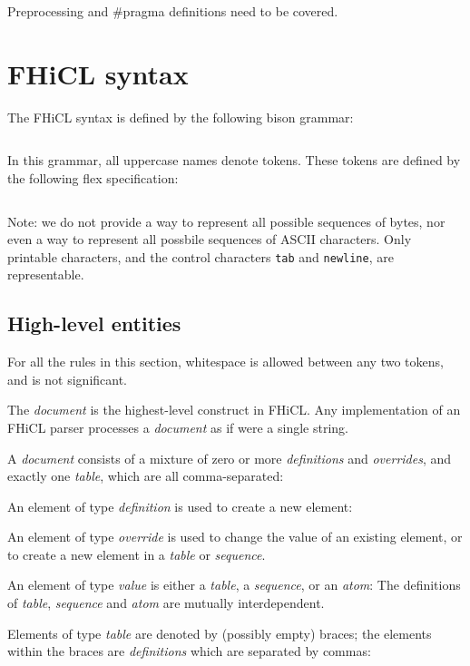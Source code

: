 \documentclass{memarticle}
\begin{document}
Preprocessing and \#pragma definitions need to be covered.

\chapter{FHiCL syntax}

The FHiCL syntax is defined by the following bison grammar:
\begin{verbatim}

\end{verbatim}

In this grammar,
all uppercase names denote tokens.
These tokens are defined by the following flex specification:
\begin{verbatim}

\end{verbatim}

\begin{fixme}
  Note: we do not provide a way to represent all possible sequences of
  bytes, nor even a way to represent all possbile sequences of ASCII
  characters. Only printable characters, and the control characters
  \texttt{tab} and \texttt{newline}, are representable.
\end{fixme}

\section{High-level entities}

For all the rules in this section,
whitespace is allowed between any two tokens,
and is not significant.

The \emph{document} is the highest-level construct
in FHiCL.
Any implementation of an FHiCL parser
processes a \emph{document}
as if were a single string.

A \emph{document} consists of a mixture of
zero or more \emph{definitions}
and \emph{overrides},
and exactly one \emph{table},
which are all comma-separated:

An element of type \emph{definition} is used to
create a new element:

An element of type \emph{override} is used to
change the value of an existing element,
or to create a new element in a \emph{table} or \emph{sequence}.

An element of type \emph{value} is either a \emph{table},
a \emph{sequence},
or an \emph{atom}:
The definitions of \emph{table}, \emph{sequence} and \emph{atom} are mutually interdependent.

Elements of type \emph{table} are denoted by (possibly empty) braces;
the elements within the braces
are \emph{definitions}
which are separated by commas:
\end{document}
